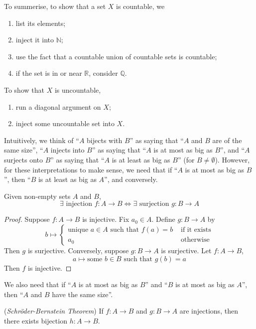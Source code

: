 \documentclass[10pt, a4paper, twoside]{report}
\begin{document}
To summerise, to show that a set \(X\) is countable, we 
\begin{enumerate}
    \item list its elements;
    \item inject it into \(\mathbb{N}\);
    \item use the fact that a countable union of countable sets is countable;
    \item if the set is in or near \(\mathbb{R}\), consider \(\mathbb{Q}\).
\end{enumerate}
To show that \(X\) is uncountable,
\begin{enumerate}
    \item run a diagonal argument on \(X\);
    \item inject some uncountable set into \(X\).
\end{enumerate}
Intuitively, we think of ``\(A\) bijects with \(B\)'' as saying that ``\(A\) and \(B\) are of the same size'', ``\(A\) injects into \(B\)'' as saying that ``\(A\) is at most as big as \(B\)'', and ``\(A\) surjects onto \(B\)'' as saying that ``\(A\) is at least as big as \(B\)'' (for \(B\neq\emptyset\)). However, for these interpretations to make sense, we need that if ``\(A\) is at most as big as \(B\)'', then ``\(B\) is at least as big as \(A\)'', and conversely.
\begin{lemma}
    Given non-empty sets \(A\) and \(B\), 
    \[\exists\text{  injection  }f:A\to B\Leftrightarrow\exists\text{  surjection  }g:B\to A\]
\end{lemma}
\begin{proof}
    Suppose \(f:A\to B\) is injective. Fix \(a_0\in A\). Define \(g:B\to A\) by 
    \[b\mapsto \begin{cases}
        \text{unique  }a\in A\text{  such that  }f(a)=b & \text{ if it exists} \\
        a_0&\text{ otherwise}
    \end{cases}\]
    Then \(g\) is surjective. Conversely, suppose \(g:B\to A\) is surjective. Let \(f:A\to B\),
    \[a\mapsto\text{some  }b\in B\text{  such that  }g(b)=a\]
    Then \(f\) is injective.
\end{proof}
We also need that if ``\(A\) is at most as big as \(B\)'' and ``\(B\) is at most as big as \(A\)'', then ``\(A\) and \(B\) have the same size''.
\begin{theorem}
    (\emph{Schröder-Bernstein Theorem}) If \(f:A\to B\) and \(g:B\to A\) are injections, then there exists bijection \(h:A\to B\). 
\end{theorem}
\end{document}
